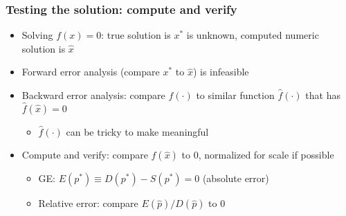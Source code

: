 \documentclass[bigger]{beamer}
\begin{document}
\begin{frame}%

\frametitle{Testing the solution: compute and verify}

\begin{itemize}
\item Solving $f\left( x\right) =0$: true solution is $x^{\ast }$ is
unknown, \newline
computed numeric solution is $\hat{x}$

\item Forward error analysis (compare $x^{\ast }$ to $\hat{x}$) is infeasible

\item Backward error analysis: compare $f\left( \cdot \right) $ to similar
function $\hat{f}\left( \cdot \right) $ that has $\hat{f}\left( \hat{x}%
\right) =0$

\begin{itemize}
\item $\hat{f}\left( \cdot \right) $ can be tricky to make meaningful
\end{itemize}

\item Compute and verify: compare $f\left( \hat{x}\right) $ to $0$, \newline
normalized for scale if possible

\begin{itemize}
\item GE: $E\left( p^{\ast }\right) \equiv D\left( p^{\ast }\right) -S\left(
p^{\ast }\right) =0$ (absolute error)

\item Relative error: compare $E\left( \hat{p}\right) /D\left( \hat{p}%
\right) $ to $0$
\end{itemize}
\end{itemize}


\end{frame}%
\end{document}

